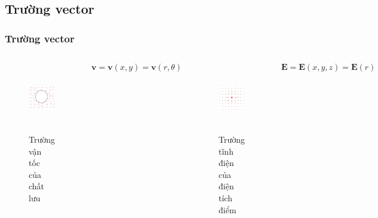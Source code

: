 \subsection{Trường vector}
\begin{frame}
    \frametitle{Trường vector}
    \begin{columns}
            \begin{figure}
                \centering
                \includegraphics[width=4cm, height=3cm]{Content/Figure/streamline.png}
                \caption{Trường vận tốc của chất lưu}
            \end{figure}
            \[\mathbf{v}=\mathbf{v}(x,y)=\mathbf{v}(r,\theta)\]
            \begin{figure}
                \centering
                \includegraphics[width=4cm, height=3cm]{Content/Figure/electric_charge.png}
                \caption{Trường tĩnh điện của điện tích điểm}
            \end{figure}
            \[\mathbf{E}=\mathbf{E}(x,y,z)=\mathbf{E}(r)\]
    \end{columns}
\end{frame}
